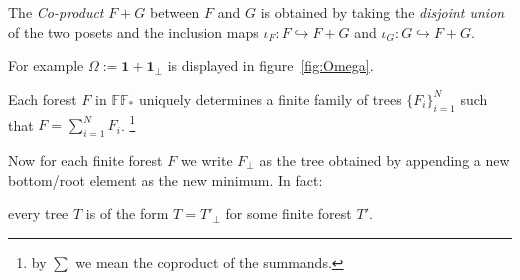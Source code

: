 \begin{thm}[Co-product]
	The \emph{Co-product} $F+G$ between $F$ and $G$ is obtained by taking the \emph{disjoint union} of the two posets and the inclusion maps $\iota_F : F \hookrightarrow F+G$ and $\iota_G : G \hookrightarrow F+G $. 
\end{thm}

For example $\Omega := \textbf{1} + \textbf{1}_{\bot}$ is displayed in figure~\ref{fig:Omega}.


\begin{cor}
	Each forest $F$ in $\mathbb{FF}_*$ uniquely determines a finite family of trees $\{F_i\}_{i=1}^N$ such that $F = \sum_{i=1}^{N} F_i$. \footnote{by $\sum$ we mean the coproduct of the summands.}
\end{cor}

	
\newpage

Now for each finite forest $F$ we write $F_{\bot}$ as the tree obtained by appending a new bottom/root element as the new minimum.\newline 
In fact:
\begin{remark}
	every tree $T$ is of the form $T = T'_{\bot}$ for some finite forest $T'$.
\end{remark}

